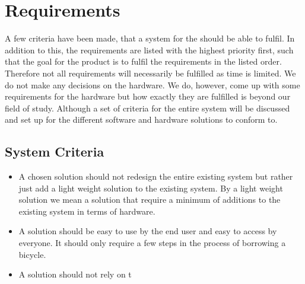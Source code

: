 \section{Requirements}
A few criteria have been made, that a system for the \bycykel should be able to fulfil. 
In addition to this, the requirements are listed with the highest priority first, such that the goal for the product is to fulfil the requirements in the listed order. 
Therefore not all requirements will necessarily be fulfilled as time is limited.
We do not make any decisions on the hardware.
We do, however, come up with some requirements for the hardware but how exactly they are fulfilled is beyond our field of study.
Although a set of criteria for the entire system will be discussed and set up for the different software and hardware solutions to conform to.

\subsection{System Criteria}
\begin{itemize}
	\item A chosen solution should not redesign the entire existing system but rather just add a light weight solution to the existing system. By a light weight solution  we mean a solution that require a minimum of additions to the existing system in terms of hardware.
	\item A solution should be easy to use by the end user and easy to access by everyone. It should only require a few steps in the process of borrowing a bicycle.
	\item A solution should not rely on t
\end{itemize}


